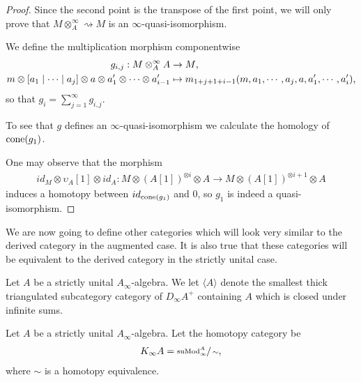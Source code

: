 \documentclass[../thesis.tex]{subfiles}
\begin{document}
            \begin{proof}
                Since the second point is the transpose of the first point, we will only prove that $M \otimes_A^\infty \rightsquigarrow M$ is an $\infty$-quasi-isomorphism.

                We define the multiplication morphism componentwise
                \begin{align*}
                    g_{i,j} : M \otimes_A^\infty A & \rightarrow M\tt{,} \\
                    m \otimes [a_1\mid \cdots \mid a_{j}] \otimes a \otimes a'_1 \otimes \cdots \otimes a'_{i-1} & \mapsto m_{1+j+1+i-1}(m,a_1,\cdots,a_j,a,a'_1,\cdots,a'_i)\tt{,}
                \end{align*}
                so that $g_i = \sum_{j=1}^\infty g_{i,j}$.

                To see that $g$ defines an $\infty$-quasi-isomorphism we calculate the homology of $\tt{cone}(g_1)$.

                One may observe that the morphism 
                \begin{align*}
                    id_M \otimes \upsilon_A[1] \otimes id_A : M \otimes (A[1])^{\otimes i} \otimes A \rightarrow M \otimes (A[1])^{\otimes i+1} \otimes A
                \end{align*}
                induces a homotopy between $id_{\tt{cone}(g_1)}$ and $0$, so $g_1$ is indeed a quasi-isomorphism.
            \end{proof}

            We are now going to define other categories which will look very similar to the derived category in the augmented case. It is also true that these categories will be equivalent to the derived category in the strictly unital case.

            \begin{definition}
                Let $A$ be a strictly unital $A_\infty$-algebra. We let $\langle A \rangle$ denote the smallest thick triangulated subcategory category of $D_\infty A^+$ containing $A$ which is closed under infinite sums. 
            \end{definition}

            \begin{definition}
                Let $A$ be a strictly unital $A_\infty$-algebra. Let the homotopy category be
                \begin{align*}
                    K_\infty A = \sfrac{\tt{suMod}_\infty^A}{\sim}\tt{,}
                \end{align*}
                where $\sim$ is a homotopy equivalence.
            \end{definition}
\end{document}
